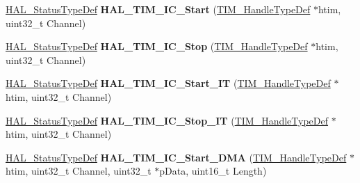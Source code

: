 \begin{DoxyCompactItemize}
\item 
\hyperlink{stm32f4xx__hal__def_8h_a63c0679d1cb8b8c684fbb0632743478f}{H\+A\+L\+\_\+\+Status\+Type\+Def} {\bfseries H\+A\+L\+\_\+\+T\+I\+M\+\_\+\+I\+C\+\_\+\+Start} (\hyperlink{struct_t_i_m___handle_type_def}{T\+I\+M\+\_\+\+Handle\+Type\+Def} $\ast$htim, uint32\+\_\+t Channel)\hypertarget{group___t_i_m___exported___functions___group4_gaab393018ca6f8fad04a815feb1796ce7}{}\label{group___t_i_m___exported___functions___group4_gaab393018ca6f8fad04a815feb1796ce7}

\item 
\hyperlink{stm32f4xx__hal__def_8h_a63c0679d1cb8b8c684fbb0632743478f}{H\+A\+L\+\_\+\+Status\+Type\+Def} {\bfseries H\+A\+L\+\_\+\+T\+I\+M\+\_\+\+I\+C\+\_\+\+Stop} (\hyperlink{struct_t_i_m___handle_type_def}{T\+I\+M\+\_\+\+Handle\+Type\+Def} $\ast$htim, uint32\+\_\+t Channel)\hypertarget{group___t_i_m___exported___functions___group4_ga1b5edb103cb27dbd5380e9b24d12658f}{}\label{group___t_i_m___exported___functions___group4_ga1b5edb103cb27dbd5380e9b24d12658f}

\item 
\hyperlink{stm32f4xx__hal__def_8h_a63c0679d1cb8b8c684fbb0632743478f}{H\+A\+L\+\_\+\+Status\+Type\+Def} {\bfseries H\+A\+L\+\_\+\+T\+I\+M\+\_\+\+I\+C\+\_\+\+Start\+\_\+\+IT} (\hyperlink{struct_t_i_m___handle_type_def}{T\+I\+M\+\_\+\+Handle\+Type\+Def} $\ast$htim, uint32\+\_\+t Channel)\hypertarget{group___t_i_m___exported___functions___group4_gac0e3515f374ec6b9d30609cd683649d6}{}\label{group___t_i_m___exported___functions___group4_gac0e3515f374ec6b9d30609cd683649d6}

\item 
\hyperlink{stm32f4xx__hal__def_8h_a63c0679d1cb8b8c684fbb0632743478f}{H\+A\+L\+\_\+\+Status\+Type\+Def} {\bfseries H\+A\+L\+\_\+\+T\+I\+M\+\_\+\+I\+C\+\_\+\+Stop\+\_\+\+IT} (\hyperlink{struct_t_i_m___handle_type_def}{T\+I\+M\+\_\+\+Handle\+Type\+Def} $\ast$htim, uint32\+\_\+t Channel)\hypertarget{group___t_i_m___exported___functions___group4_gaf5664e207667c99ef50378813056e5f6}{}\label{group___t_i_m___exported___functions___group4_gaf5664e207667c99ef50378813056e5f6}

\item 
\hyperlink{stm32f4xx__hal__def_8h_a63c0679d1cb8b8c684fbb0632743478f}{H\+A\+L\+\_\+\+Status\+Type\+Def} {\bfseries H\+A\+L\+\_\+\+T\+I\+M\+\_\+\+I\+C\+\_\+\+Start\+\_\+\+D\+MA} (\hyperlink{struct_t_i_m___handle_type_def}{T\+I\+M\+\_\+\+Handle\+Type\+Def} $\ast$htim, uint32\+\_\+t Channel, uint32\+\_\+t $\ast$p\+Data, uint16\+\_\+t Length)\hypertarget{group___t_i_m___exported___functions___group4_gac3b7deffff43a8bdc3e2eea42115efff}{}\label{group___t_i_m___exported___functions___group4_gac3b7deffff43a8bdc3e2eea42115efff}


\end{DoxyCompactItemize}
